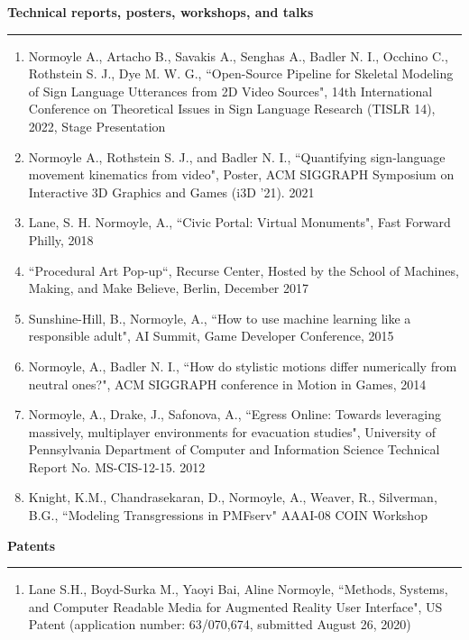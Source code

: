 {\Large {\bf  Technical reports, posters, workshops, and talks}}
\vspace{0.1cm}
\hrule
\medskip

\begin{enumerate}[leftmargin=*]
\item Normoyle A., Artacho B., Savakis A., Senghas A., Badler N. I., Occhino C., Rothstein S. J., Dye M. W. G., ``Open-Source Pipeline for Skeletal Modeling of Sign Language Utterances 
from 2D Video Sources", 14th International Conference on Theoretical Issues in Sign Language Research (TISLR 14), 2022, Stage Presentation

\item Normoyle A., Rothstein S. J., and Badler N. I., ``Quantifying sign-language movement kinematics from video", Poster, ACM SIGGRAPH Symposium on Interactive
3D Graphics and Games (i3D ’21). 2021

\item Lane, S. H. Normoyle, A., ``Civic Portal: Virtual Monuments", Fast Forward Philly, 2018

\item ``Procedural Art Pop-up``, Recurse Center, Hosted by the School of Machines, Making, and Make Believe, Berlin, December 2017 

\item Sunshine-Hill, B., Normoyle, A., ``How to use machine learning like a responsible adult", AI Summit, Game Developer Conference, 2015

\item Normoyle, A., Badler N. I., ``How do stylistic motions differ numerically from neutral ones?", ACM SIGGRAPH conference in Motion in Games, 2014

\item Normoyle, A., Drake, J., Safonova, A., ``Egress Online: Towards leveraging massively, multiplayer environments for evacuation studies", University of Pennsylvania Department of Computer and Information Science Technical Report No. MS-CIS-12-15. 2012

\item Knight, K.M., Chandrasekaran, D., Normoyle, A., Weaver, R., Silverman, B.G., ``Modeling Transgressions in PMFserv" AAAI-08 COIN Workshop
\end{enumerate}

\medskip
\medskip

{\Large {\bf Patents}}
\vspace{0.1cm}
\hrule
\medskip

\begin{enumerate}[leftmargin=*]
\item Lane S.H., Boyd-Surka M., Yaoyi Bai, Aline Normoyle, ``Methods, Systems, and Computer Readable Media for Augmented Reality User Interface", US Patent (application number: 63/070,674, submitted August 26, 2020)
\end{enumerate}

